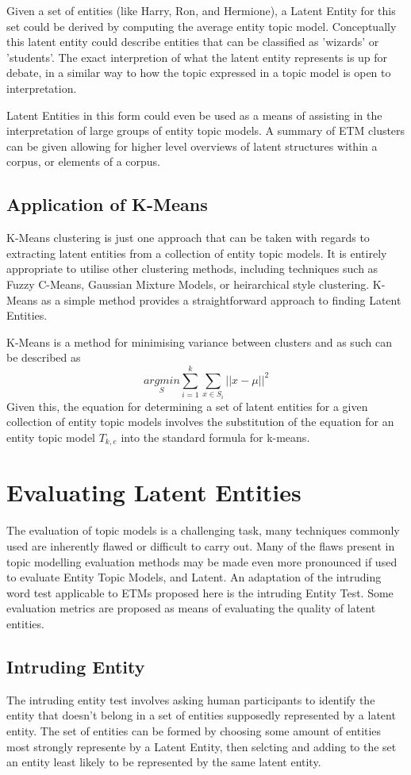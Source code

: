 \documentclass[10pt]{report}
\begin{document}
Given a set of entities (like Harry, Ron, and Hermione), a Latent Entity for this set could be derived by computing the average entity topic model. Conceptually this latent entity could describe entities that can be classified as 'wizards' or 'students'. The exact interpretion of what the latent entity represents is up for debate, in a similar way to how the topic expressed in a topic model is open to interpretation.

Latent Entities in this form could even be used as a means of assisting in the interpretation of large groups of entity topic models. A summary of ETM clusters can be given allowing for higher level overviews of latent structures within a corpus, or elements of a corpus.

\subsection{Application of K-Means}
K-Means clustering is just one approach that can be taken with regards to extracting latent entities from a collection of entity topic models. It is entirely appropriate to utilise other clustering methods, including techniques such as Fuzzy C-Means, Gaussian Mixture Models, or heirarchical style clustering. K-Means as a simple method provides a straightforward approach to finding Latent Entities.

K-Means is a method for minimising variance between clusters and as such can be described as
\[
  \underset{S}{argmin} \sum^{k}_{i=1}\sum^{}_{x\in S_i}||x-\mu||^2
\]
Given this, the equation for determining a set of latent entities for a given collection of entity topic models involves the substitution of the equation for an entity topic model \(T_{k,e}\) into the standard formula for k-means.
\section{Evaluating Latent Entities}
The evaluation of topic models is a challenging task, many techniques commonly used are inherently flawed or difficult to carry out. Many of the flaws present in topic modelling evaluation methods may be made even more pronounced if used to evaluate Entity Topic Models, and Latent. An adaptation of the intruding word test applicable to ETMs proposed here is the intruding Entity Test. Some evaluation metrics are proposed as means of evaluating the quality of latent entities.

\subsection{Intruding Entity}
The intruding entity test involves asking human participants to identify the entity that doesn't belong in a set of entities supposedly represented by a latent entity. The set of entities can be formed by choosing some amount of entities most strongly represente by a Latent Entity, then selcting and adding to the set an entity least likely to be represented by the same latent entity.
\end{document}

